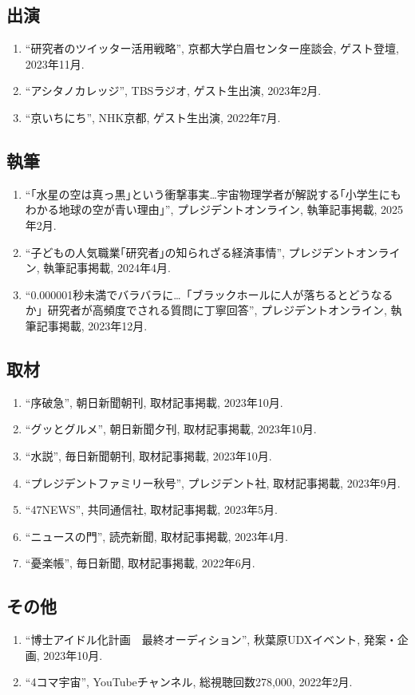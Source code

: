 \documentclass[uplatex, 11pt]{jsarticle}
\begin{document}
\subsection*{出演}
\begin{enumerate}
\item “研究者のツイッター活用戦略”, 京都大学白眉センター座談会, ゲスト登壇, 2023年11月.
\item “アシタノカレッジ”, TBSラジオ, ゲスト生出演, 2023年2月.
\item “京いちにち”, NHK京都, ゲスト生出演, 2022年7月.
\end{enumerate}
\subsection*{執筆}
\begin{enumerate}
\item “｢水星の空は真っ黒｣という衝撃事実…宇宙物理学者が解説する｢小学生にもわかる地球の空が青い理由｣”, プレジデントオンライン, 執筆記事掲載, 2025年2月.
\item “子どもの人気職業｢研究者｣の知られざる経済事情”, プレジデントオンライン, 執筆記事掲載, 2024年4月.
\item “0.000001秒未満でバラバラに…「ブラックホールに人が落ちるとどうなるか」研究者が高頻度でされる質問に丁寧回答”, プレジデントオンライン, 執筆記事掲載, 2023年12月.
\end{enumerate}
\subsection*{取材}
\begin{enumerate}
\item “序破急”, 朝日新聞朝刊, 取材記事掲載, 2023年10月.
\item “グッとグルメ”, 朝日新聞夕刊, 取材記事掲載, 2023年10月.
\item “水説”, 毎日新聞朝刊, 取材記事掲載, 2023年10月.
\item “プレジデントファミリー秋号”, プレジデント社, 取材記事掲載, 2023年9月.
\item “47NEWS”, 共同通信社, 取材記事掲載, 2023年5月.
\item “ニュースの門”, 読売新聞, 取材記事掲載, 2023年4月.
\item “憂楽帳”, 毎日新聞, 取材記事掲載, 2022年6月.
\end{enumerate}
\subsection*{その他}
\begin{enumerate}
\item “博士アイドル化計画　最終オーディション”, 秋葉原UDXイベント, 発案・企画, 2023年10月.
\item “4コマ宇宙”, YouTubeチャンネル, 総視聴回数278,000, 2022年2月.
\end{enumerate}

\end{document}
